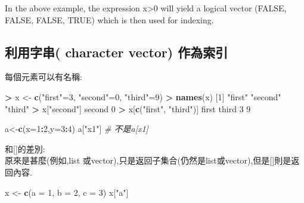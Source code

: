 \documentclass[]{book}
\newenvironment{Shaded}{\begin{snugshade}}{\end{snugshade}}
\newcommand{\CommentTok}[1]{\textcolor[rgb]{0.56,0.35,0.01}{\textit{#1}}}
\newcommand{\DataTypeTok}[1]{\textcolor[rgb]{0.13,0.29,0.53}{#1}}
\newcommand{\DecValTok}[1]{\textcolor[rgb]{0.00,0.00,0.81}{#1}}
\newcommand{\KeywordTok}[1]{\textcolor[rgb]{0.13,0.29,0.53}{\textbf{#1}}}
\newcommand{\NormalTok}[1]{#1}
\newcommand{\OperatorTok}[1]{\textcolor[rgb]{0.81,0.36,0.00}{\textbf{#1}}}
\newcommand{\StringTok}[1]{\textcolor[rgb]{0.31,0.60,0.02}{#1}}
\theoremstyle{definition}
\theoremstyle{definition}
\theoremstyle{definition}
\theoremstyle{remark}
\begin{document}
In the above example, the expression x\textgreater{}0 will yield a
logical vector (FALSE, FALSE, FALSE, TRUE) which is then used for
indexing.

\hypertarget{-character-vector-}{%
\subsection{利用字串( character vector)
作為索引}\label{-character-vector-}}

每個元素可以有名稱:

\begin{Shaded}
\begin{Highlighting}[]
\OperatorTok{>}\StringTok{ }\NormalTok{x <-}\StringTok{ }\KeywordTok{c}\NormalTok{(}\StringTok{"first"}\NormalTok{=}\DecValTok{3}\NormalTok{, }\StringTok{"second"}\NormalTok{=}\DecValTok{0}\NormalTok{, }\StringTok{"third"}\NormalTok{=}\DecValTok{9}\NormalTok{)}
\OperatorTok{>}\StringTok{ }\KeywordTok{names}\NormalTok{(x)}
\NormalTok{[}\DecValTok{1}\NormalTok{] }\StringTok{"first"}  \StringTok{"second"} \StringTok{"third"} 
\OperatorTok{>}\StringTok{ }\NormalTok{x[}\StringTok{"second"}\NormalTok{]}
\NormalTok{second }
\DecValTok{0} 
\OperatorTok{>}\StringTok{ }\NormalTok{x[}\KeywordTok{c}\NormalTok{(}\StringTok{"first"}\NormalTok{, }\StringTok{"third"}\NormalTok{)]}
\NormalTok{first third }
\DecValTok{3}     \DecValTok{9}
\end{Highlighting}
\end{Shaded}

\begin{Shaded}
\begin{Highlighting}[]
\NormalTok{a<-}\KeywordTok{c}\NormalTok{(}\DataTypeTok{x=}\DecValTok{1}\OperatorTok{:}\DecValTok{2}\NormalTok{,}\DataTypeTok{y=}\DecValTok{3}\OperatorTok{:}\DecValTok{4}\NormalTok{)}
\NormalTok{a[}\StringTok{"x1"}\NormalTok{] }\CommentTok{# 不是a[x1]}
\end{Highlighting}
\end{Shaded}

\protect\hyperlink{section-1}{}
和{[}\protect\hyperlink{section-1}{}{]}的差別:\\
原來是甚麼(例如,list
或vector),\protect\hyperlink{section-1}{}只是返回子集合(仍然是list或vector),但是{[}\protect\hyperlink{section-1}{}{]}則是返回內容.

\begin{Shaded}
\begin{Highlighting}[]
\NormalTok{x <-}\StringTok{ }\KeywordTok{c}\NormalTok{(}\DataTypeTok{a =} \DecValTok{1}\NormalTok{, }\DataTypeTok{b =} \DecValTok{2}\NormalTok{, }\DataTypeTok{c =} \DecValTok{3}\NormalTok{)}
\NormalTok{x[}\StringTok{"a"}\NormalTok{]}
\end{Highlighting}
\end{Shaded}
\end{document}
